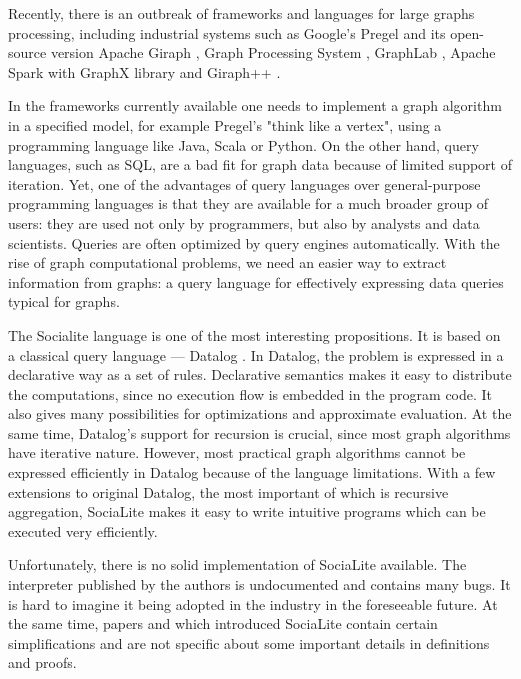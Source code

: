 Recently, there is an outbreak of frameworks and languages for large graphs processing, including industrial systems such as Google's Pregel \cite{pregel} and its open-source version Apache Giraph \cite{giraph}, Graph Processing System \cite{gps}, GraphLab \cite{graphlabwww, graphlab, graphlab2}, Apache Spark with GraphX library \cite{spark2, sparkwww} and Giraph++ \cite{giraphpp}.

In the frameworks currently available one needs to implement a graph algorithm in a specified model, for example Pregel's "think like a vertex", using a programming language like Java, Scala or Python. On the other hand, query languages, such as SQL, are a bad fit for graph data because of limited support of iteration. Yet, one of the advantages of query languages over general-purpose programming languages is that they are available for a much broader group of users: they are used not only by programmers, but also by analysts and data scientists. Queries are often optimized by query engines automatically. With the rise of graph computational problems, we need an easier way to extract information from graphs: a query language for effectively expressing data queries typical for graphs.

The Socialite \cite{socialite, distsoc} language is one of the most interesting propositions. It is based on a classical query language ---  Datalog \cite{fod}. In Datalog, the problem is expressed in a declarative way as a set of rules. Declarative semantics makes it easy to distribute the computations, since no execution flow is embedded in the program code. It also gives many possibilities for optimizations and approximate evaluation. At the same time, Datalog's support for recursion is crucial, since most graph algorithms have iterative nature. However, most practical graph algorithms cannot be expressed efficiently in Datalog because of the language limitations. With a few extensions to original Datalog, the most important of which is recursive aggregation, SociaLite makes it easy to write intuitive programs which can be executed very efficiently.

Unfortunately, there is no solid implementation of SociaLite available. The interpreter published by the authors is undocumented and contains many bugs. It is hard to imagine it being adopted in the industry in the foreseeable future. At the same time, papers \cite{socialite} and \cite{distsoc} which introduced SociaLite contain certain simplifications and are not specific about some important details in definitions and proofs.

